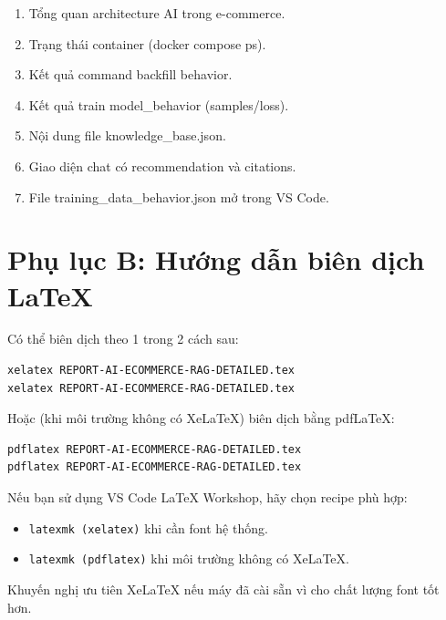 \documentclass[12pt,a4paper]{article}
\begin{document}
\begin{enumerate}
  \item Tổng quan architecture AI trong e-commerce.
  \item Trạng thái container (docker compose ps).
  \item Kết quả command backfill behavior.
  \item Kết quả train model\_behavior (samples/loss).
  \item Nội dung file knowledge\_base.json.
  \item Giao diện chat có recommendation và citations.
  \item File training\_data\_behavior.json mở trong VS Code.
\end{enumerate}

\section*{Phụ lục B: Hướng dẫn biên dịch LaTeX}

Có thể biên dịch theo 1 trong 2 cách sau:
\begin{lstlisting}[style=pythonstyle,caption={Build PDF bằng XeLaTeX}]
xelatex REPORT-AI-ECOMMERCE-RAG-DETAILED.tex
xelatex REPORT-AI-ECOMMERCE-RAG-DETAILED.tex
\end{lstlisting}

Hoặc (khi môi trường không có XeLaTeX) biên dịch bằng pdfLaTeX:
\begin{lstlisting}[style=pythonstyle,caption={Build PDF bằng pdfLaTeX}]
pdflatex REPORT-AI-ECOMMERCE-RAG-DETAILED.tex
pdflatex REPORT-AI-ECOMMERCE-RAG-DETAILED.tex
\end{lstlisting}

Nếu bạn sử dụng VS Code LaTeX Workshop, hãy chọn recipe phù hợp:
\begin{itemize}
  \item \texttt{latexmk (xelatex)} khi cần font hệ thống.
  \item \texttt{latexmk (pdflatex)} khi môi trường không có XeLaTeX.
\end{itemize}

Khuyến nghị ưu tiên XeLaTeX nếu máy đã cài sẵn vì cho chất lượng font tốt hơn.
\end{document}
